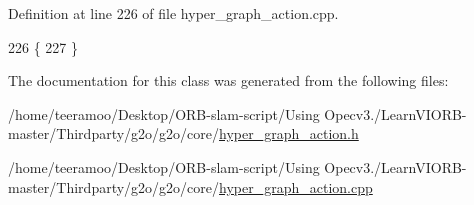 Definition at line 226 of file hyper\+\_\+graph\+\_\+action.\+cpp.


\begin{DoxyCode}
226                                   \{
227   \}
\end{DoxyCode}


The documentation for this class was generated from the following files\+:\begin{DoxyCompactItemize}
\item 
/home/teeramoo/\+Desktop/\+O\+R\+B-\/slam-\/script/\+Using Opecv3./\+Learn\+V\+I\+O\+R\+B-\/master/\+Thirdparty/g2o/g2o/core/\hyperlink{hyper__graph__action_8h}{hyper\+\_\+graph\+\_\+action.\+h}\item 
/home/teeramoo/\+Desktop/\+O\+R\+B-\/slam-\/script/\+Using Opecv3./\+Learn\+V\+I\+O\+R\+B-\/master/\+Thirdparty/g2o/g2o/core/\hyperlink{hyper__graph__action_8cpp}{hyper\+\_\+graph\+\_\+action.\+cpp}\end{DoxyCompactItemize}
